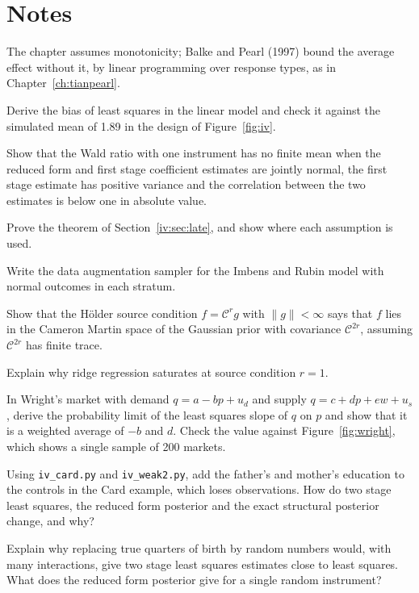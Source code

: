 \section*{Notes}



The chapter assumes monotonicity; Balke and Pearl (1997) bound the average effect without it, by linear programming over response types, as in Chapter~\ref{ch:tianpearl}.

\begin{exercises}
\item\label{ex:ch10:1} Derive the bias of least squares in the linear model and check it against the simulated mean of 1.89 in the design of Figure~\ref{fig:iv}.
\item\label{ex:ch10:2} Show that the Wald ratio with one instrument has no finite mean when the reduced form and first stage coefficient estimates are jointly normal, the first stage estimate has positive variance and the correlation between the two estimates is below one in absolute value.
\item\label{ex:ch10:3} Prove the theorem of Section~\ref{iv:sec:late}, and show where each assumption is used.
\item\label{ex:ch10:4} Write the data augmentation sampler for the Imbens and Rubin model with normal outcomes in each stratum.
\item\label{ex:ch10:5} Show that the H\"older source condition $f = \mathcal{C}^{r}g$ with $\|g\| < \infty$ says that $f$ lies in the Cameron Martin space of the Gaussian prior with covariance $\mathcal{C}^{2r}$, assuming $\mathcal{C}^{2r}$ has finite trace.
\item\label{ex:ch10:6} Explain why ridge regression saturates at source condition $r = 1$.
\item\label{ex:iv:wright} In Wright's market with demand $q = a - bp + u_d$ and supply $q = c + dp + ew + u_s$, derive the probability limit of the least squares slope of $q$ on $p$ and show that it is a weighted average of $-b$ and $d$. Check the value against Figure~\ref{fig:wright}, which shows a single sample of 200 markets.
\item\label{ex:iv:card} Using \texttt{iv\_card.py} and \texttt{iv\_weak2.py}, add the father's and mother's education to the controls in the Card example, which loses observations. How do two stage least squares, the reduced form posterior and the exact structural posterior change, and why?
\item\label{ex:iv:qob} Explain why replacing true quarters of birth by random numbers would, with many interactions, give two stage least squares estimates close to least squares. What does the reduced form posterior give for a single random instrument?

\end{exercises}
